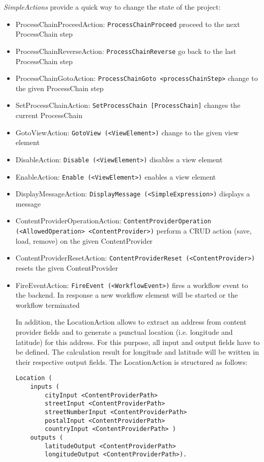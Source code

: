 \textit{SimpleActions} provide a quick way to change the state of the project:
\begin{itemize}
\item ProcessChainProceedAction: \lstinline!ProcessChainProceed!
\subitem proceed to the next ProcessChain step
\item ProcessChainReverseAction: \lstinline!ProcessChainReverse!
\subitem go back to the last ProcessChain step
\item ProcessChainGotoAction: \lstinline!ProcessChainGoto <processChainStep>!
\subitem change to the given ProcessChain step
\item SetProcessChainAction: \lstinline!SetProcessChain [ProcessChain]!
\subitem changes the current ProcessChain
\item GotoViewAction: \lstinline!GotoView (<ViewElement>)!
\subitem change to the given view element
\item DisableAction: \lstinline!Disable (<ViewElement>)!
\subitem disables a view element
\item EnableAction: \lstinline!Enable (<ViewElement>)!
\subitem enables a view element
\item DisplayMessageAction: \lstinline!DisplayMessage (<SimpleExpression>)!
\subitem displays a message
\item ContentProviderOperationAction: \lstinline!ContentProviderOperation (<AllowedOperation> <ContentProvider>)!
\subitem perform a CRUD action (save, load, remove) on the given ContentProvider
\item ContentProviderResetAction: \lstinline!ContentProviderReset (<ContentProvider>)!
\subitem resets the given ContentProvider
\item FireEventAction: \lstinline!FireEvent (<WorkflowEvent>)!
\subitem fires a workflow event to the backend. In response a new workflow element will be started or the workflow terminated

In addition, the LocationAction allows to extract an address from content provider fields and to generate a punctual location (i.e. longitude and latitude) for this address. For this purpose, all input and output fields have to be defined. The calculation result for longitude and latitude will be written in their respective output fields. The LocationAction is structured as follows:

\begin{lstlisting}
Location (
	inputs (
		cityInput <ContentProviderPath>
		streetInput <ContentProviderPath>
		streetNumberInput <ContentProviderPath>
		postalInput <ContentProviderPath>
		countryInput <ContentProviderPath> )
	outputs (
		latitudeOutput <ContentProviderPath>
		longitudeOutput <ContentProviderPath>).
\end{lstlisting}

 
\end{itemize}

